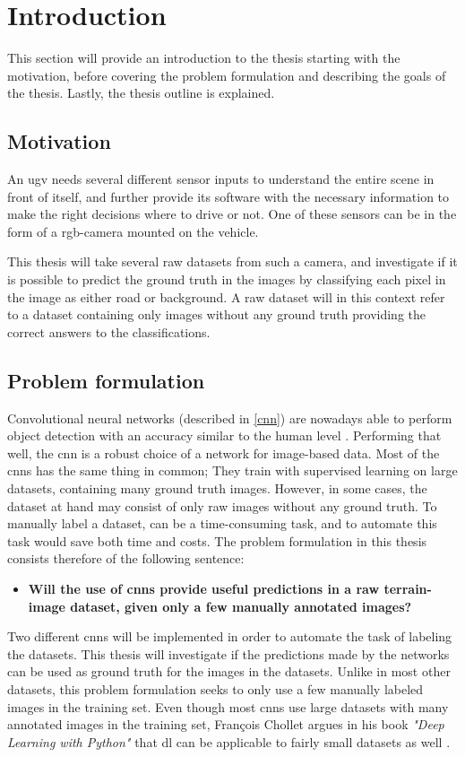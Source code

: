 \documentclass[USenglish]{ifimaster}  %
\begin{document}
\mainmatter{}
\chapter{Introduction}
This section will provide an introduction to the thesis starting with the motivation, before covering the problem formulation and describing the goals of the thesis. Lastly, the thesis outline is explained. 
\section{Motivation}
An \ac{ugv} needs several different sensor inputs to understand the entire scene in front of itself, and further provide its software with the necessary information to make the right decisions where to drive or not. One of these sensors can be in the form of a \ac{rgb}-camera mounted on the vehicle.

This thesis will take several raw datasets from such a camera, and investigate if it is possible to predict the ground truth in the images by classifying each pixel in the image as either road or background. A raw dataset will in this context refer to a dataset containing only images without any ground truth providing the correct answers to the classifications.

\section{Problem formulation}
Convolutional neural networks (described in \cref{cnn}) are nowadays able to perform object detection with an accuracy similar to the human level \cite{website:cnn}. Performing that well, the \ac{cnn} is a robust choice of a network for image-based data. Most of the \acp{cnn} has the same thing in common; They train with supervised learning on large datasets, containing many ground truth images. However, in some cases, the dataset at hand may consist of only raw images without any ground truth. To manually label a dataset, can be a time-consuming task, and to automate this task would save both time and costs. The problem formulation in this thesis consists therefore of the following sentence:
\begin{itemize}
\centering
  \item[] \textbf{Will the use of \acp{cnn} provide useful predictions in a raw terrain-image dataset, given only a few manually annotated images?} 
\end{itemize}

Two different \acp{cnn} will be implemented in order to automate the task of labeling the datasets. This thesis will investigate if the predictions made by the networks can be used as ground truth for the images in the datasets. Unlike in most other datasets, this problem formulation seeks to only use a few manually labeled images in the training set. Even though most \acp{cnn} use large datasets with many annotated images in the training set, François Chollet argues in his book \textit{"Deep Learning with Python"} that \ac{dl} can be applicable to fairly small datasets as well \cite{Francois_Deep_learning_with_python}. 
\end{document}

